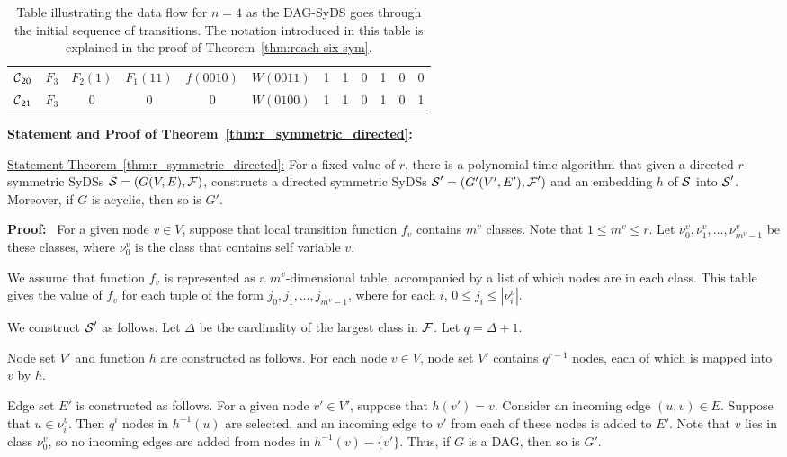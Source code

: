 \begin{table*}
\begin{center}
\begin{tabular}{|l | c c c c c c c c c c c |}
$\mbox{$\mathcal{C}$}_{20}$ & $F_3$ & $F_2(1)$ & $F_1(11)$ & $f(0010)$ & $W(0011)$ & 1 & 1 & 0 & 1 & 0 & 0 \\ 
$\mbox{$\mathcal{C}$}_{21}$ & $F_3$ & 0 & 0 & 0 & $W(0100)$ & 1 & 1 & 0 & 1 & 0 & 1 \\ \hline
\end{tabular}
\end{center}
\caption{Table illustrating the data flow for $n = 4$ 
as the DAG-SyDS \cals{} goes through the initial sequence of transitions.
The notation introduced in this table is explained in the proof of 
Theorem~\ref{thm:reach-six-sym}.}
\label{tab:dag_syds_trans}
\end{table*}

\medskip

\noindent
\textbf{Statement and Proof of Theorem~\ref{thm:r_symmetric_directed}:}

\medskip

\noindent
\underline{Statement Theorem~\ref{thm:r_symmetric_directed}:}
For a fixed value of $r$, there is a polynomial time algorithm that
given a directed $r$-symmetric SyDSs $\mbox{$\mathcal{S}$} = (G(V,E), \mbox{$\mathcal{F}$})$,
constructs a directed symmetric SyDSs $\mbox{$\mathcal{S}$}' = (G'(V',E'), \mbox{$\mathcal{F}$}')$
and an embedding $h$ of $\mbox{$\mathcal{S}$}$ into $\mbox{$\mathcal{S}$}'$.  Moreover, if  $G$
is acyclic, then so is $G'$.  

\medskip

\noindent
\textbf{Proof:}~ 
For a given node $v \in V$, 
suppose that local transition function $f_v$ contains $m^v$ classes.
Note that $1 \leq m^v \leq r$.
Let $\nu_0^v, \nu_1^v, \ldots ,\nu_{m^v-1}^v$ be these classes,
where $\nu_0^v$ is the class that contains self variable $v$.

We assume that function $f_v$  is represented 
as a $m^v$-dimensional table,
accompanied by a list of which nodes are in each class.
This table gives the value of $f_v$ for each tuple
of the form $j_0,  j_1, \ldots , j_{m^v -1}$,
where for each $i$, $0 \leq j_i \leq |\nu_i^v|$.

We construct $\mbox{$\mathcal{S}$}'$ as follows.
Let $\Delta$ be the cardinality of the largest class in $\mbox{$\mathcal{F}$}$.
Let $q =  \Delta + 1$.

Node set $V'$ and function $h$ are constructed as follows.
For each node $v \in V$,
node set $V'$ contains $q^{r-1}$ nodes, each of which is mapped into $v$ by $h$.

 Edge set $E'$ is constructed as follows.
For a given node $v' \in V'$,
suppose that $h(v') = v$.
Consider an incoming edge $(u,v) \in E$.
Suppose that $u \in \nu_i^v$.
Then $q^i$ nodes in $h^{-1}(u)$ are selected,
and an incoming edge to $v'$ from each of these nodes is added to $E'$.
Note that $v$  lies in class  $\nu_0^v$,
so no incoming edges are added from nodes in $h^{-1}(v) - \{v'\}$.
Thus, if $G$ is a DAG, then so is $G'$.

